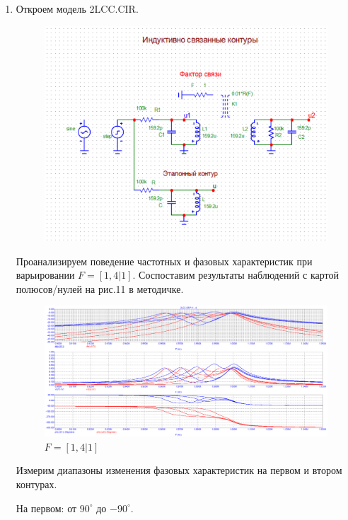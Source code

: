 \documentclass[a4paper, 12pt]{article}%
\begin{document}
\begin{enumerate}

\item Откроем модель 2LCC.CIR. 

\begin{figure}[h!]
\centering
\includegraphics[scale = 0.7]{images/2LCM.png}
\label{fig:Image1}
\end{figure}

Проанализируем поведение частотных и фазовых характеристик при варьировании $F = [1,4|1]$. Соспоставим результаты наблюдений с картой полюсов/нулей на рис.11 в методичке.

\begin{figure}[h!]
\centering
\includegraphics[scale = 0.4]{images/plot2-1_1.png}
\caption{$F = [1,4|1]$}
\label{fig:Image1}
\end{figure}

Измерим диапазоны изменения фазовых характеристик на первом и втором контурах.

На первом: от $90^{\circ}$ до $-90^{\circ}$.


\end{enumerate}
\end{document}
